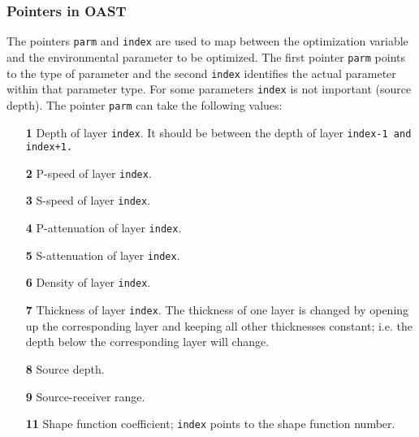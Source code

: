 \documentclass{saclantc}
\begin{document}
\subsubsection {Pointers in OAST}
 \label{se:oastp}
The pointers {\tt parm} and {\tt index} are used to map between the optimization variable and the
environmental parameter to be optimized. The first pointer  {\tt parm}
points to the
type of parameter and the second {\tt index} identifies the actual
parameter within that parameter type.
For some parameters {\tt index} is not important (source depth).  
The pointer {\tt parm} can take the following values:
\begin{itemize}
    \item[\bf 1] Depth of layer {\tt index}. It should be between the depth of
layer \tt index-1 \rm and {\tt index+1}.
\vspace{-0.3cm}
    \item[\bf 2] P-speed of layer {\tt index}.
\vspace{-0.3cm}
    \item[\bf 3] S-speed of layer {\tt index}.
\vspace{-0.3cm}
    \item[\bf 4] P-attenuation of layer {\tt index}.
\vspace{-0.3cm}
    \item[\bf 5] S-attenuation of layer {\tt index}.
\vspace{-0.3cm}
    \item[\bf 6] Density of layer {\tt index}.
\vspace{-0.3cm}
    \item[\bf 7] Thickness  of layer {\tt index}. The thickness of one layer is changed by opening up the
corresponding layer and keeping all other thicknesses constant; i.e. the depth
below the corresponding layer will  change.
\vspace{-0.3cm}
    \item[\bf 8] Source depth.
\vspace{-0.3cm}
    \item[\bf 9] Source-receiver range.
\vspace{-0.3cm}
    \item[\bf 11] Shape function coefficient; {\tt index} points to the shape 
function number.
\end{itemize}
\end{document}
